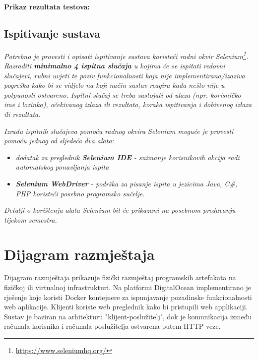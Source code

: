			\noindent\textbf{Prikaz rezultata testova:}
			\eject




			
			\subsection{Ispitivanje sustava}
			
			 \textit{Potrebno je provesti i opisati ispitivanje sustava koristeći radni okvir Selenium\footnote{\url{https://www.seleniumhq.org/}}. Razraditi \textbf{minimalno 4 ispitna slučaja} u kojima će se ispitati redovni slučajevi, rubni uvjeti te poziv funkcionalnosti koja nije implementirana/izaziva pogrešku kako bi se vidjelo na koji način sustav reagira kada nešto nije u potpunosti ostvareno. Ispitni slučaj se treba sastojati od ulaza (npr. korisničko ime i lozinka), očekivanog izlaza ili rezultata, koraka ispitivanja i dobivenog izlaza ili rezultata.\\ }
			 
			 \textit{Izradu ispitnih slučajeva pomoću radnog okvira Selenium moguće je provesti pomoću jednog od sljedeća dva alata:}
			 \begin{itemize}
			 	\item \textit{dodatak za preglednik \textbf{Selenium IDE} - snimanje korisnikovih akcija radi automatskog ponavljanja ispita	}
			 	\item \textit{\textbf{Selenium WebDriver} - podrška za pisanje ispita u jezicima Java, C\#, PHP koristeći posebno programsko sučelje.}
			 \end{itemize}
		 	\textit{Detalji o korištenju alata Selenium bit će prikazani na posebnom predavanju tijekom semestra.}
			
			\eject 
		
		
		\section{Dijagram razmještaja}

			 \noindent Dijagram razmještaja prikazuje fizički razmještaj programskih artefakata 
			 na fizičkoj ili virtualnoj infrastrukturi. Na platformi DigitalOcean implementirano je
			 rješenje koje koristi Docker kontejnere za ispunjavanje pozadinske funkcionalnosti 
			 web aplikacije. Klijenti koriste web preglednik kako bi pristupili web applikaciji.
			 Sustav je baziran na arhitekturu "klijent-poslužitelj", dok je komunikacija između 
			 računala korisnika i računala poslužitelja ostvarena putem HTTP veze.
			

